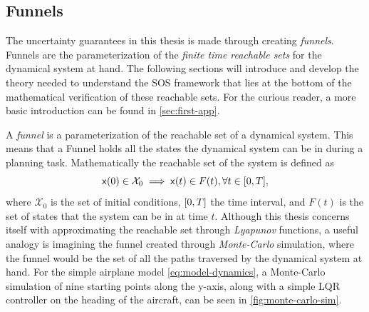 
\subsection{Funnels}
\label{sec:funnels}

The uncertainty guarantees in this thesis is made through creating
\textit{funnels}. Funnels are the parameterization of the \textit{finite time
  reachable sets} for the dynamical system at hand. The following sections will
introduce and develop the theory needed to understand the \ac{SOS} framework
that lies at the bottom of the mathematical verification of these reachable
sets. For the curious reader, a more basic introduction can be found in
\cref{sec:first-app}.

A \textit{funnel} is a parameterization of the reachable set of a dynamical
system. This means that a Funnel holds all the states the dynamical system can
be in during a planning task. Mathematically the reachable set of the system is
defined as
\[
  {\mathbf{\mathsf{x}}}(0) \in \mathcal{X}_0 \implies {\mathbf{\mathsf{x}}}(t) \in F(t), \forall t \in
  \lbrack0,T\rbrack,
\]
where \(\mathcal{X}_0\) is the set of initial conditions, \(\lbrack0,T\rbrack\) the time
interval, and \(F(t)\) is the set of states that the system can be in at time
\(t\). Although this thesis concerns itself with approximating the reachable set
through \textit{Lyapunov} functions, a useful analogy is imagining the funnel
created through \textit{Monte-Carlo} simulation, where the funnel would be the
set of all the paths traversed by the dynamical system at hand. For the simple
airplane model \cref{eq:model-dynamics}, a Monte-Carlo simulation of nine
starting points along the y-axis, along with a simple \ac{LQR} controller on the
heading of the aircraft, can be seen in \cref{fig:monte-carlo-sim}.

